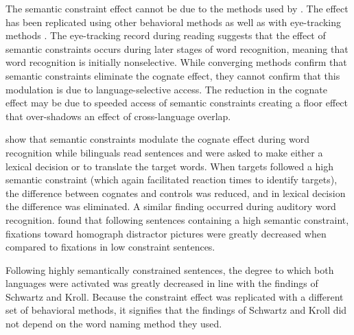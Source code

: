 The semantic constraint effect cannot be due to the methods used by \textcite{Schwartz2006}. The effect has been replicated using other behavioral methods as well as with eye-tracking methods \parencite[e.g.,][]{Chambers2009,Libben2009,VanHell2008}. The eye-tracking record during reading suggests that the effect of semantic constraints occurs during later stages of word recognition, meaning that word recognition is initially nonselective. While converging methods confirm that semantic constraints eliminate the cognate effect, they cannot confirm that this modulation is due to language-selective access. The reduction in the cognate effect may be due to speeded access of semantic constraints creating a floor effect that over-shadows an effect of cross-language overlap. 

\textcite{VanHell2008} show that semantic constraints modulate the cognate effect during word recognition while bilinguals read sentences and were asked to make either a lexical decision or to translate the target words. When targets followed a high semantic constraint (which again facilitated reaction times to identify targets), the difference between cognates and controls was reduced, and in lexical decision the difference was eliminated. A similar finding occurred during auditory word recognition. \textcite{Chambers2009} found  that following sentences containing a high semantic constraint, fixations toward homograph distractor pictures were greatly decreased when compared to fixations in low constraint sentences. 

Following highly semantically constrained sentences, the degree to which both languages were activated was greatly decreased in line with the findings of Schwartz and Kroll. Because the constraint effect was replicated with a different set of behavioral methods, it signifies that the findings of Schwartz and Kroll did not depend on the word naming method they used. 



